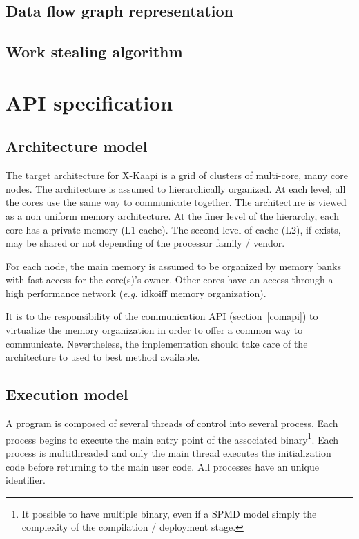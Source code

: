\documentclass[12pt]{report}
\begin{document}
\section{Data flow graph representation}

\section{Work stealing algorithm}

\newpage
\chapter{API specification}

\section{Architecture model}

The target architecture for X-Kaapi is a grid of clusters of multi-core, many core nodes.
The architecture is assumed to hierarchically organized. At each level, all the cores use the same way to communicate together. The architecture is viewed as a non uniform memory architecture.
At the finer level of the hierarchy, each core has a private memory (L1 cache). The second level of cache  (L2), if exists, may be shared or not depending of the processor family / vendor. 

For each node, the main memory is assumed to be organized by memory banks with fast access for the core(s)'s owner. Other cores have an access through a high performance network (\textit{e.g.} idkoiff memory organization).

It is to the responsibility of the communication API (section~\ref{comapi}) to virtualize the memory organization in order to offer a common way to communicate. Nevertheless, the implementation should take care of the architecture to used to best method available.

\section{Execution model}
A program is composed of several threads of control into several process. 
Each process begins to execute the main entry point of the associated binary\footnote{It possible to have multiple binary, even if a SPMD model simply the complexity of the compilation / deployment stage.}. Each process is multithreaded and only the main thread  executes the initialization code before returning to the main user code. All processes have an unique identifier.
\end{document}
